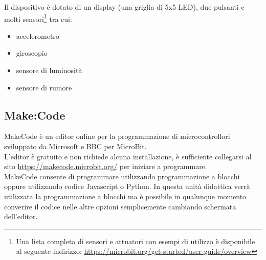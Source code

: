 \documentclass[../../docenti.tex]{subfiles}
\begin{document}
Il dispositivo è dotato di un display (una griglia di 5x5 LED), due pulsanti e molti sensori\footnote{Una lista completa di sensori e attuatori con esempi di utilizzo è disponibile al seguente indirizzo: \url{https://microbit.org/get-started/user-guide/overview}} tra cui:
\begin{itemize}
	\item accelerometro
	\item giroscopio
	\item sensore di luminosità
	\item sensore di rumore
\end{itemize}

\subsection{Make:Code}
MakeCode è un editor online per la programmazione di microcontrollori sviluppato da Microsoft e BBC per MicroBit.\\
L'editor è gratuito e non richiede alcuna installazione, è sufficiente collegarsi al sito \url{https://makecode.microbit.org/} per iniziare a programmare.\\

MakeCode consente di programmare utilizzando programmazione a blocchi oppure utilizzando codice Javascript o Python. In questa unità didattica verrà utilizzata la programmazione a blocchi ma è possibile in qualunque momento converire il codice nelle altre opzioni semplicemente cambiando schermata dell'editor.
\end{document}
